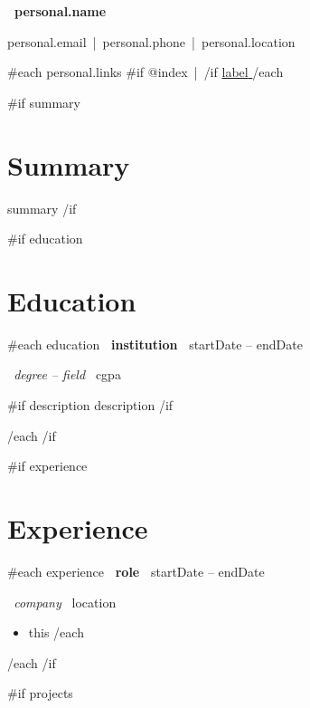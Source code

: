 \documentclass[10pt,a4paper]{article}
\begin{document}
\begin{center}
    {\LARGE \textbf{ {{~personal.name~}} }}
    \vspace{4pt}

    {{personal.email}} \,|\, {{personal.phone}} \,|\, {{personal.location}}
    \vspace{2pt}

    {{#each personal.links}}
        {{#if @index}} \,|\, {{/if}}
        \href{ {{url}} }{ {{label}} }
    {{/each}}
\end{center}


{{#if summary}}
\section{Summary}
{{summary}}
{{/if}}


{{#if education}}
\section{Education}

{{#each education}}
\textbf{ {{~institution~}} } \hfill {{startDate}} -- {{endDate}}

\textit{ {{~degree}} -- {{field~}} } \hfill {{cgpa}}

{{#if description}}
{{description}}
{{/if}}

\vspace{4pt}

{{/each}}
{{/if}}


{{#if experience}}
\section{Experience}

{{#each experience}}
\textbf{ {{~role~}} } \hfill {{startDate}} -- {{endDate}}

\textit{ {{~company~}} } \hfill {{location}}

\begin{itemize}
{{#each bullets}}
    \item {{this}}
{{/each}}
\end{itemize}

{{/each}}
{{/if}}


{{#if projects}}
\end{document}
